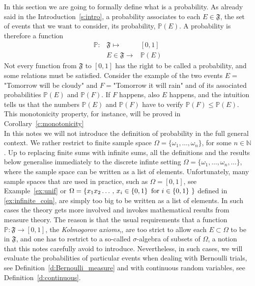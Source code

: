     In this section we are going to formally define what is a probability. As already said in the Introduction~\ref{s:intro}, a probability associates to each  $E \in \mathfrak F$, the set of events that we want to consider, its probability, $\mathbb P(E)$. A probability is therefore a function 
    \begin{equation}
	    \label{e:prob_def}
	    \begin{array}{ccc}
		    \mathbb P: &\mathfrak F  \mapsto & [0,1]\\
		   &  E \in\mathfrak F  \to & \mathbb P(E)
		\end{array}
	\end{equation}
 Not every function from $\mathfrak F$ to $[0,1]$ has the right to be called a probability, and some relations must be satisfied. Consider the example of the two events $E = $"Tomorrow will be cloudy" and $ F = $"Tomorrow it will rain" and of its associated probabilities $\mathbb P(E)$ and $\mathbb P(F)$. If $F$ happens, also $E$ happens, and the intuition tells us that the numbers  $\mathbb P(E)$ and $\mathbb P(F)$ have to verify $\mathbb P(F) \leq \mathbb P(E)$. This monotonicity property, for instance, will be proved in Corollary~\ref{c:monotonicity} \\
	In this notes we will not introduce the definition of probability in the full general context. We rather restrict to finite sample space $\Omega = \{\omega_1, \ldots, \omega_n\}$, for some $n \in \mathbb N$. Up to replacing finite sums with infinite sums, all the definitions and the results below generalise immediately to the discrete infinte setting $\Omega = \{\omega_1, \ldots, \omega_n, \ldots\}$, where the sample space can be written as a list of elements. Unfortunately, many sample spaces that are used in practice, such as $\Omega = [0,1]$, see Example~\ref{ex:unif} or $\Omega = \{x_1x_2\ldots \, , \, x_i \in\{0,1\}\,\text{ for $ i \in \{0,1\}$ } \}$ defined in \ref{ex:infinite_coin}, are simply too big to be written as a list of elements. In such cases the theory gets more involved and invokes mathematical results from measure theory. The reason is that the usual requirements that a function $\mathbb P: \mathfrak  F \to [0,1]$, the \emph{ Kolmogorov axioms},, are too strict to allow each $E \subset \Omega$ to be in $\mathfrak F$, and one has to restrict to a so-called $\sigma$-algebra of subsets of $\Omega$, a notion that this notes carefully avoid to introduce. Nevertheless, in such cases, we will evaluate the probabilities of particular events when dealing with Bernoulli trials, see Definition~\ref{d:Bernoulli_measure} and with continuous random variables, see Definition~\ref{d:continuous}. 
   

